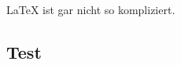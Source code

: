 \documentclass{article}
\begin{document}
	\LaTeX{} ist gar nicht so kompliziert.
	
	\subsection{Test}
\end{document}
